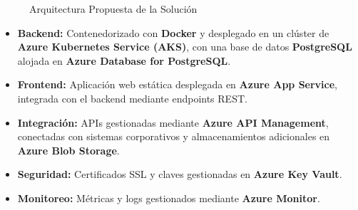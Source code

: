 \documentclass{article}
\begin{document}
\begin{figure}[htbp]
  \centering
  \caption{Arquitectura Propuesta de la Solución}
  \label{fig:arquitectura-solucion}
\end{figure}

\begin{itemize}
    \item \textbf{Backend:} Contenedorizado con \textbf{Docker} y desplegado en un clúster de \textbf{Azure Kubernetes Service (AKS)}, con una base de datos \textbf{PostgreSQL} alojada en \textbf{Azure Database for PostgreSQL}.
    \item \textbf{Frontend:} Aplicación web estática desplegada en \textbf{Azure App Service}, integrada con el backend mediante endpoints REST.
    \item \textbf{Integración:} APIs gestionadas mediante \textbf{Azure API Management}, conectadas con sistemas corporativos y almacenamientos adicionales en \textbf{Azure Blob Storage}.
    \item \textbf{Seguridad:} Certificados SSL y claves gestionadas en \textbf{Azure Key Vault}.
    \item \textbf{Monitoreo:} Métricas y logs gestionados mediante \textbf{Azure Monitor}.
\end{itemize}
\end{document}
